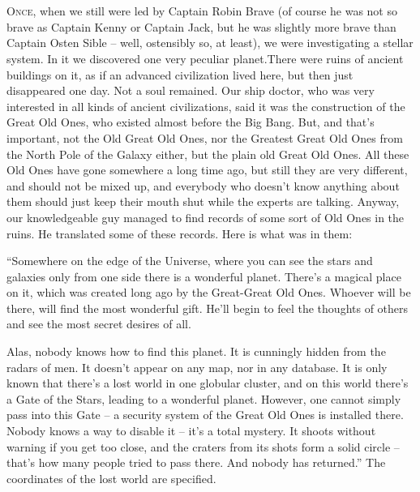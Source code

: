 \documentclass[ebook,twoside,final,openright]{memoir}
\begin{document}
\chapter{}
\par
\lettrine{O}{nce,} when we still were led by Captain Robin Brave (of course he was not so brave as Captain Kenny or Captain Jack, but he was slightly more brave than Captain Osten Sible – well, ostensibly so, at least), we were investigating a stellar system. In it we discovered one very peculiar planet.There were ruins of ancient buildings on it, as if an advanced civilization lived here, but then just disappeared one day. Not a soul remained. Our ship doctor, who was very interested in all kinds of ancient civilizations, said it was the construction of the Great Old Ones, who existed almost before the Big Bang. But, and that’s important, not the Old Great Old Ones, nor the Greatest Great Old Ones from the North Pole of the Galaxy either, but the plain old Great Old Ones. All these Old Ones have gone somewhere a long time ago, but still they are very different, and should not be mixed up, and everybody who doesn’t know anything about them should just keep their mouth shut while the experts are talking. Anyway, our knowledgeable guy managed to find records of some sort of Old Ones in the ruins. He translated some of these records. Here is what was in them:\par
\par
“Somewhere on the edge of the Universe, where you can see the stars and galaxies only from one side there is a wonderful planet. There’s a magical place on it, which was created long ago by the Great-Great Old Ones. Whoever will be there, will find the most wonderful gift. He’ll begin to feel the thoughts of others and see the most secret desires of all. \par
Alas, nobody knows how to find this planet. It is cunningly hidden from the radars of men. It doesn’t appear on any map, nor in any database. It is only known that there’s a lost world in one globular cluster, and on this world there’s a Gate of the Stars, leading to a wonderful planet. However, one cannot simply pass into this Gate – a security system of the Great Old Ones is installed there. Nobody knows a way to disable it – it’s a total mystery. It shoots without warning if you get too close, and the craters from its shots form a solid circle – that's how many people tried to pass there. And nobody has returned.” The coordinates of the lost world are specified.\par
\end{document}
